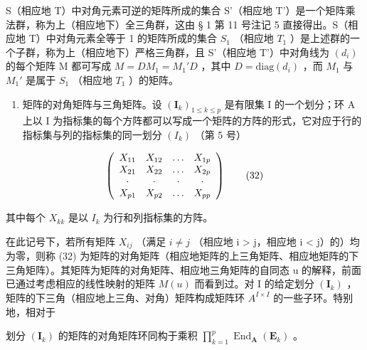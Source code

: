 S（相应地 T）中对角元素可逆的矩阵所成的集合 S'（相应地 T'）是一个矩阵乘法群，称为上（相应地下）全三角群，这由 § 1 第 11 号注记 5 直接得出。S（相应地 T）中对角元素全等于 1 的矩阵所成的集合 \(S_{1}\) （相应地 \(T_{1}\) ）是上述群的一个子群，称为上（相应地下）严格三角群，且 S'（相应地 T'）中对角线为 \((d_{i})\) 的每个矩阵 M 都可写成 \(M = DM_{1} = M_{1}'D\) ，其中 \(D = \mathrm{diag}(d_{i})\) ，而 \(M_{1}\) 与 \(M_{1}'\) 是属于 \(S_{1}\) （相应地 \(T_{1}\) ）的矩阵。

\begin{enumerate}
\def\labelenumi{\Roman{enumi}.}
\setcounter{enumi}{3}
\tightlist
\item
  矩阵的对角矩阵与三角矩阵。设 \((\mathbf{I}_k)_{1 \leqslant k \leqslant p}\) 是有限集 I 的一个划分；环 A 上以 I 为指标集的每个方阵都可以写成一个矩阵的方阵的形式，它对应于行的指标集与列的指标集的同一划分 \((I_{k})\) （第 5 号）
\end{enumerate}

\[
\left( \begin{array}{c c c c} X _ {1 1} & X _ {1 2} & \ldots & X _ {1 p} \\ X _ {2 1} & X _ {2 2} & \ldots & X _ {2 p} \\ \cdot & \cdot & \cdot & \cdot \\ X _ {p 1} & X _ {p 2} & \ldots & X _ {p p} \end{array} \right)\tag{32}
\]

其中每个 \(X_{kk}\) 是以 \(I_{k}\) 为行和列指标集的方阵。

在此记号下，若所有矩阵 \(X_{ij}\) （满足 \(i \neq j\) （相应地 i \textgreater{} j，相应地 i \textless{} j）的）均为零，则称 (32) 为矩阵的对角矩阵（相应地矩阵的上三角矩阵、相应地矩阵的下三角矩阵）。其矩阵为矩阵的对角矩阵、相应地三角矩阵的自同态 u 的解释，前面已通过考虑相应的线性映射的矩阵 \(M(u)\) 而看到过。对 I 的给定划分 \((\mathbf{I}_{k})\) ，矩阵的下三角（相应地上三角、对角）矩阵构成矩阵环 \(A^{I \times I}\) 的一些子环。特别地，相对于

划分 \((\mathbf{I}_k)\) 的矩阵的对角矩阵环同构于乘积 \(\prod_{k=1}^{p} \operatorname{End}_{\mathbf{A}}(\mathbf{E}_k)\) 。
\relax{}
